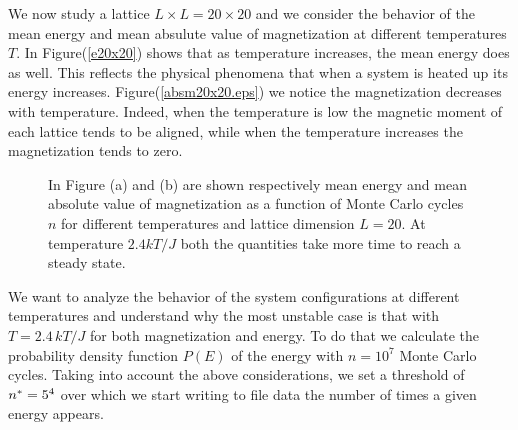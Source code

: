 \documentclass[%
preprint,
 amsmath,amssymb,
 aps,
]{revtex4-1}
\theoremstyle{plain}
\theoremstyle{definition}
\theoremstyle{plain}
\begin{document}
We now study a lattice $L \times L = 20 \times 20$ and we consider the behavior of the mean energy and mean absulute value of magnetization at different temperatures $T$. 
In Figure(\ref{e20x20}) shows that as temperature increases, the mean energy does as well. This reflects the physical phenomena that when a system is heated up its energy increases. Figure(\ref{absm20x20.eps}) we notice the magnetization decreases with temperature. Indeed, when the temperature is low the magnetic moment of each lattice tends to be aligned, while when the temperature increases the magnetization tends to zero. 
\begin{figure}[H]
\centering
\caption{In Figure (a) and (b) are shown respectively mean energy and mean absolute value of magnetization as a function of Monte Carlo cycles $n$ for different temperatures and lattice dimension $L=20$. At temperature $2.4 kT/J$ both the quantities take more time to reach a steady state.}
\end{figure}
We want to analyze the behavior of the system configurations at different temperatures and understand why the most unstable case is that with $T=2.4 \, kT/J$ for both magnetization and energy. To do that we calculate the probability density function $P(E)$ of the energy with $n=10^7$ Monte Carlo cycles. Taking into account the above considerations, we set a threshold of $n^* = 5 \time 10^4 $ over which we start writing to file data the number of times a given energy appears. \\
\end{document}
